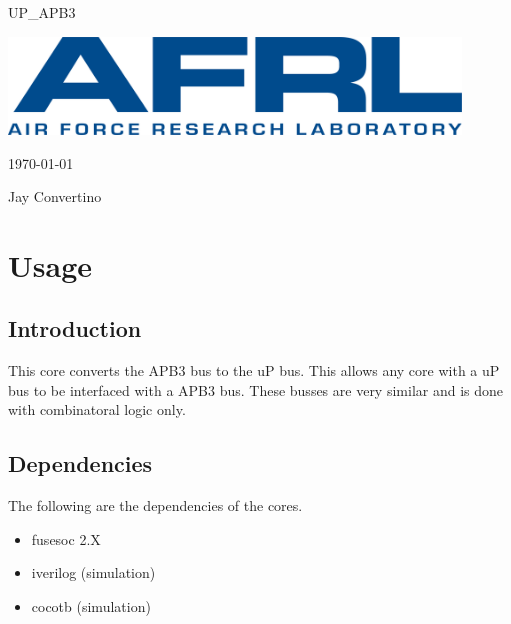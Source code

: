 \begin{titlepage}
  \begin{center}

  {\Huge UP\_APB3}

  \vspace{25mm}

  \includegraphics[width=0.90\textwidth,height=\textheight,keepaspectratio]{img/AFRL.png}

  \vspace{25mm}

  \today

  \vspace{15mm}

  {\Large Jay Convertino}

  \end{center}
\end{titlepage}

\tableofcontents

\newpage

\section{Usage}

\subsection{Introduction}

\par
This core converts the APB3 bus to the uP bus. This allows any core with a uP bus to be interfaced with a APB3 bus. These
busses are very similar and is done with combinatoral logic only.

\subsection{Dependencies}

\par
The following are the dependencies of the cores.

\begin{itemize}
  \item fusesoc 2.X
  \item iverilog (simulation)
  \item cocotb (simulation)
\end{itemize}

